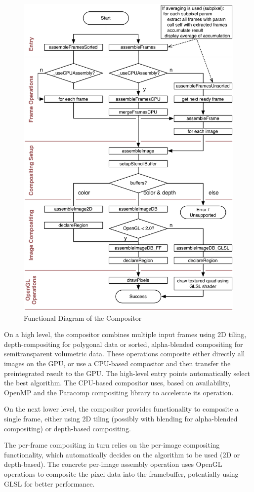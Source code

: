\documentclass[10pt,a4]{scrartcl}
\begin{document}
\begin{figure}
  \includegraphics[width=.618\textwidth]{images/compositor.pdf}
  {\caption{\label{fCompositor}Functional Diagram of the Compositor}}
\end{figure}
On a high level, the compositor combines multiple input frames using 2D
tiling, depth-compositing for polygonal data or sorted, alpha-blended
compositing for semitransparent volumetric data. These operations
composite either directly all images on the GPU, or use a CPU-based
compositor and then transfer the preintegrated result to the GPU. The
high-level entry points automatically select the best algorithm. The
CPU-based compositor uses, based on availability, OpenMP and the
Paracomp compositing library to accelerate its operation.

On the next lower level, the compositor provides functionality to
composite a single frame, either using 2D tiling (possibly with blending
for alpha-blended compositing) or depth-based compositing. 

The per-frame compositing in turn relies on the per-image compositing
functionality, which automatically decides on the algorithm to be used
(2D or depth-based). The concrete per-image assembly operation uses
OpenGL operations to composite the pixel data into the framebuffer,
potentially using GLSL for better performance.
\end{document}
